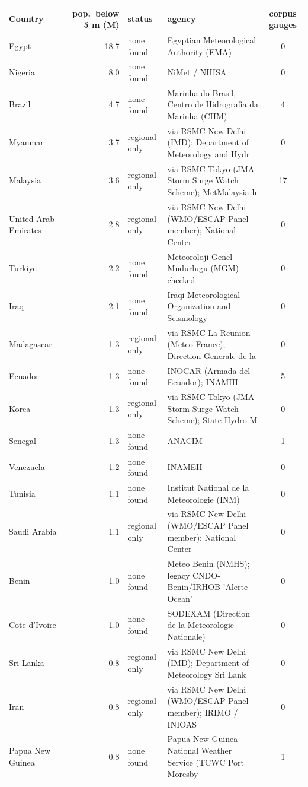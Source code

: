 \begin{tabular}{lrllc}\toprule
Country & pop.\ below 5 m (M) & status & agency & corpus gauges\\\midrule
Egypt & 18.7 & none found & Egyptian Meteorological Authority (EMA) & 0\\
Nigeria & 8.0 & none found & NiMet / NIHSA & 0\\
Brazil & 4.7 & none found & Marinha do Brasil, Centro de Hidrografia da Marinha (CHM) & 4\\
Myanmar & 3.7 & regional only & via RSMC New Delhi (IMD); Department of Meteorology and Hydr & 0\\
Malaysia & 3.6 & regional only & via RSMC Tokyo (JMA Storm Surge Watch Scheme); MetMalaysia h & 17\\
United Arab Emirates & 2.8 & regional only & via RSMC New Delhi (WMO/ESCAP Panel member); National Center & 0\\
Turkiye & 2.2 & none found & Meteoroloji Genel Mudurlugu (MGM) checked & 0\\
Iraq & 2.1 & none found & Iraqi Meteorological Organization and Seismology & 0\\
Madagascar & 1.3 & regional only & via RSMC La Reunion (Meteo-France); Direction Generale de la & 0\\
Ecuador & 1.3 & none found & INOCAR (Armada del Ecuador); INAMHI & 5\\
Korea & 1.3 & regional only & via RSMC Tokyo (JMA Storm Surge Watch Scheme); State Hydro-M & 0\\
Senegal & 1.3 & none found & ANACIM & 1\\
Venezuela & 1.2 & none found & INAMEH & 0\\
Tunisia & 1.1 & none found & Institut National de la Meteorologie (INM) & 0\\
Saudi Arabia & 1.1 & regional only & via RSMC New Delhi (WMO/ESCAP Panel member); National Center & 0\\
Benin & 1.0 & none found & Meteo Benin (NMHS); legacy CNDO-Benin/IRHOB 'Alerte Ocean' & 0\\
Cote d'Ivoire & 1.0 & none found & SODEXAM (Direction de la Meteorologie Nationale) & 0\\
Sri Lanka & 0.8 & regional only & via RSMC New Delhi (IMD); Department of Meteorology Sri Lank & 0\\
Iran & 0.8 & regional only & via RSMC New Delhi (WMO/ESCAP Panel member); IRIMO / INIOAS & 0\\
Papua New Guinea & 0.8 & none found & Papua New Guinea National Weather Service (TCWC Port Moresby & 1\\
\bottomrule\end{tabular}
